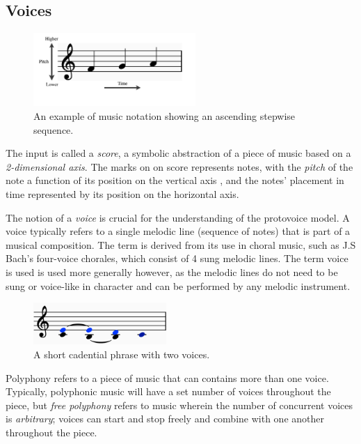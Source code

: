 \documentclass[12pt,a4paper,twoside,openright]{report}
\theoremstyle{definition}
\begin{document}
\subsection{Voices}
\begin{figure}[h!]
  \centering
  \includegraphics[width=0.55\textwidth]{prep/pitchTime.png}
  \captionsetup{width=.7\linewidth}
  \caption{An example of music notation showing an ascending stepwise sequence.}
  \label{fig:pitchTime}
\end{figure}
The input is called a \textit{score}, a symbolic abstraction of a piece of music based on a \textit{2-dimensional axis}. The marks on on score represents notes, with the \textit{pitch} of the note a function of its position on the vertical axis \footnotemark, and the notes' placement in time represented by its position on the horizontal axis.



The notion of a \textit{voice} is crucial for the understanding of the protovoice model.
A voice typically refers to a single melodic line (sequence of notes) that is part of a musical composition.
The term is derived from its use in choral music, such as J.S Bach's four-voice chorales, which consist of 4 sung melodic lines.
The term voice is used is used more generally however, as the melodic lines do not need to be sung or voice-like in character and can be performed by any melodic instrument. 

\begin{figure}[h]
  \centering
  \includegraphics[width=0.45\textwidth]{prep/cadencevoices}
  \captionsetup{width=.9\linewidth}
  \caption{A short cadential phrase with two voices.}
  \label{fig:cadenceVoices}
\end{figure}

Polyphony refers to a piece of music that can contains more than one voice.
Typically, polyphonic music will have a set number of voices throughout the piece, but \textit{free polyphony} refers to music wherein the number of concurrent voices is \textit{arbitrary}; voices can start and stop freely and combine with one another throughout the piece. 
\end{document}
